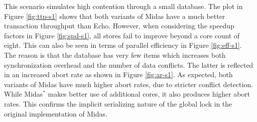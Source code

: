 This scenario simulates high contention through a small database. The plot in
Figure \ref{fig:ttp-s1} shows that both variants of Midas have a much better
transaction throughput than Echo. However, when considering the speedup factors
in Figure \ref{fig:spd-s1}, all stores fail to improve beyond a core count of
eight. This can also be seen in terms of parallel efficiency in Figure
\ref{fig:eff-s1}. The reason is that the database has very few items which
increases both synchronization overhead and the number of data conflicts. The
latter is reflected in an increased abort rate as shown in Figure
\ref{fig:ar-s1}. As expected, both variants of Midas have much higher abort
rates, due to stricter conflict detection. While Midas$^{*}$ makes better use of
additional cores, it also produces higher abort rates. This confirms the
implicit serializing nature of the global lock in the original implementation of
Midas.

